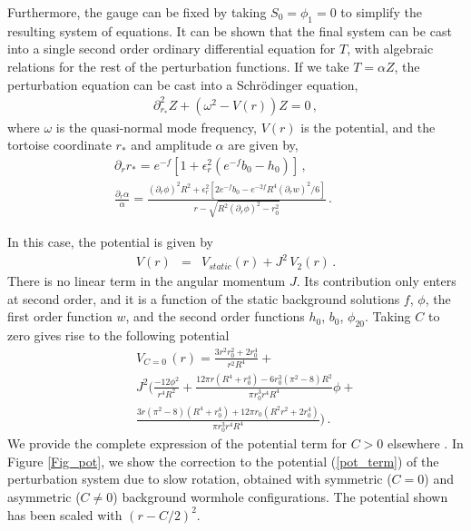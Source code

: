 \documentclass[twocolumn,showpacs,preprintnumbers,amsmath,amssymb,floatfix]{revtex4-1}
\begin{document}
Furthermore, the gauge can be fixed by taking 
%
${S}_0={\phi_1}=0$ 
to simplify the resulting system of equations. It can be shown that the 
{final}
system can be cast into a single second order ordinary differential equation for $T$, with algebraic relations for the rest of the perturbation functions.
%
%
%
%
If we take $T =\alpha Z$, the perturbation equation can be cast into a Schrödinger equation,
\begin{eqnarray}
%
    \partial^2_{r_*}Z
    + (\omega^2 - V(r))Z = 0 \, ,
\end{eqnarray}
where $\omega$ is the quasi-normal mode frequency, $V(r)$ is the potential, and the tortoise coordinate $r_*$ and amplitude $\alpha$ are given by,
\begin{eqnarray}
%
   \partial_r r_*
   = e^{-f}
   \left[
   1 +
%
   \epsilon_r^2 (e^{-f}b_0-h_0)
   \right] \, ,   \, \, \, \, \, \, \, \, \, \, \, \,  \\
%
   \frac{\partial_r\alpha}{\alpha}
%
   = \frac{(\partial_r\phi)^2R^2
   +\epsilon_r^2
   [
   2e^{-f}b_0
%
   -
%
   e^{-2f}R^4(\partial_r w)^2/6
   ]
%
   }{r-\sqrt{R^2(\partial_r\phi)^2-r_0^2}}
%
   \, .  \, \, \, \, \, \, \, \, \, \, \, \, 
\end{eqnarray}
%
%

In this case, the potential is given by
\begin{eqnarray}
    V(r) &=& V_{static}(r) + J^2 \, 
%
    V_2(r) \, .
%
%
    \label{pot_term}
\end{eqnarray}
There is no linear term in the angular momentum $J$.
Its contribution only enters at second order,
and it is a function of the static background solutions $f$, $\phi$, 
the first order function $w$, and the second order functions $h_0$, $b_0$, $\phi_{20}$.
Taking $C$ to zero gives rise to the following potential
\begin{eqnarray}
&& V_{C=0}\,{(r)} =\frac{3r^2r_0^2+2r_0^4}{r^2R^4}+ 
%
\\
&&
J^2 
\Bigg(
\frac{-12\phi^2}{r^4R^2}+
 \frac{12\pi r
(R^4+r_0^4)
-6r_0^3
(\pi^2-8)
R^2}
{\pi r_0^3 r^4 R^4}\phi+
\nonumber
\\
&& \frac{
3r(\pi^2-8)
%
(R^4+r_0^4)
+12\pi r_0
%
(R^2r^2+2r_0^4)
}{\pi r_0^3 r^4 R^4}
\Bigg) \, . \nonumber
\end{eqnarray}
We provide the complete expression of the potential term for $C>0$ %
{elsewhere \cite{Azad:2023}}.
In Figure \ref{Fig_pot}, we {show} %
the correction to the potential (\ref{pot_term}) of the perturbation system due to slow rotation, obtained with 
%
{symmetric}
($C=0$) and 
%
{asymmetric}
($C\ne 0$) background wormhole configurations.
The potential shown has been scaled with %
%
%
$\left(r-C/2\right)^2$.
\end{document}
